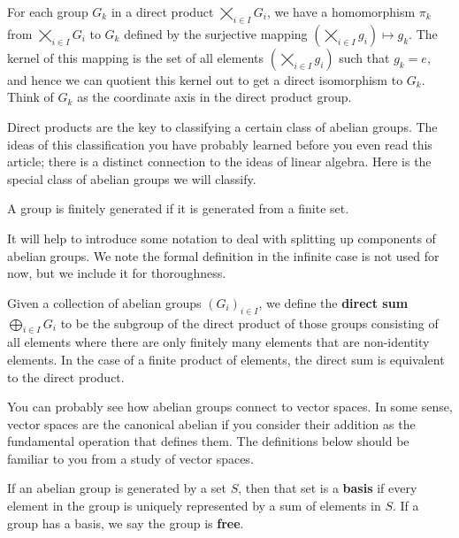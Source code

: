 For each group $G_k$ in a direct product $\bigtimes_{i \in I} G_i$, we have a homomorphism $\pi_k$ from $\bigtimes_{i \in I} G_i$ to $G_k$ defined by the surjective mapping $(\bigtimes_{i \in I} g_i) \mapsto g_k$. The kernel of this mapping is the set of all elements $(\bigtimes_{i \in I} g_i)$ such that $g_k = e$, and hence we can quotient this kernel out to get a direct isomorphism to $G_k$. Think of $G_k$ as the coordinate axis in the direct product group.

Direct products are the key to classifying a certain class of abelian groups. The ideas of this classification you have probably learned before you even read this article; there is a distinct connection to the ideas of linear algebra. Here is the special class of abelian groups we will classify.

\begin{definition}
    A group is finitely generated if it is generated from a finite set.
\end{definition}

It will help to introduce some notation to deal with splitting up components of abelian groups. We note the formal definition in the infinite case is not used for now, but we include it for thoroughness.

\begin{definition}
    Given a collection of abelian groups $(G_i)_{i \in I}$, we define the {\bf direct sum} $\bigoplus_{i \in I} G_i$ to be the subgroup of the direct product of those groups consisting of all elements where there are only finitely many elements that are non-identity elements. In the case of a finite product of elements, the direct sum is equivalent to the direct product.
\end{definition}

You can probably see how abelian groups connect to vector spaces. In some sense, vector spaces are the canonical abelian if you consider their addition as the fundamental operation that defines them. The definitions below should be familiar to you from a study of vector spaces.

\begin{definition}
    If an abelian group is generated by a set $S$, then that set is a {\bf basis} if every element in the group is uniquely represented by a sum of elements in $S$. If a group has a basis, we say the group is {\bf free}.
\end{definition}

